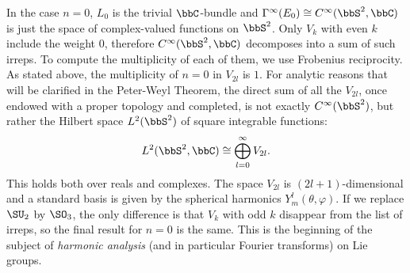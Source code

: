 \begin{example}
    In the case $n=0$, $L_0$ is the trivial $\bbC$-bundle and $\Gamma^\infty(E_0)\cong C^\infty(\bbS^2,\bbC)$ is just the space of complex-valued functions on $\bbS^2$. Only $V_k$ with even $k$ include the weight $0$, therefore $C^\infty(\bbS^2,\bbC)$ decomposes into a sum of such irreps. To compute the multiplicity of each of them, we use Frobenius reciprocity. As stated above, the multiplicity of $n=0$ in $V_{2l}$ is $1$. For analytic reasons that will be clarified in the Peter-Weyl Theorem, the direct sum of all the $V_{2l}$, once endowed with a proper topology and completed, is not exactly $C^\infty(\bbS^2)$, but rather the Hilbert space $L^2(\bbS^2)$ of square integrable functions:
    \[L^2(\bbS^2,\bbC)\cong \bigoplus_{l=0}^\infty V_{2l}.\]
    This holds both over reals and complexes. The space $V_{2l}$ is $(2l+1)$-dimensional and a standard basis is given by the spherical harmonics $Y^l_m(\theta,\varphi)$. If we replace $\SU_2$ by $\SO_3$, the only difference is that $V_k$ with odd $k$ disappear from the list of irreps, so the final result for $n=0$ is the same. This is the beginning of the subject of \emph{harmonic analysis} (and in particular Fourier transforms) on Lie groups.
\end{example}




